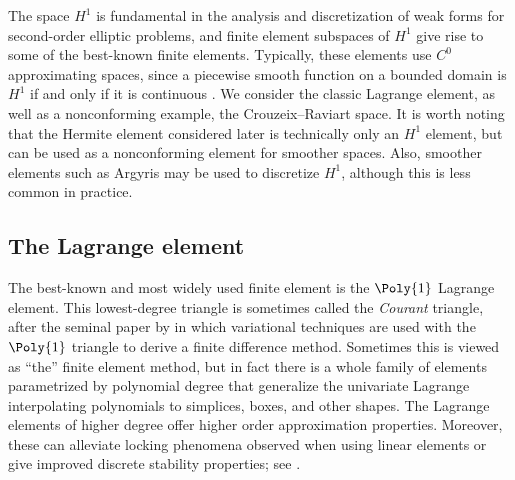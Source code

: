 The space $H^1$ is fundamental in the analysis and discretization of
weak forms for second-order elliptic problems, and finite element
subspaces of $H^1$ give rise to some of the best-known finite
elements. Typically, these elements use $C^0$ approximating spaces,
since a piecewise smooth function on a bounded domain is $H^1$ if and
only if it is continuous \citep[Theorem 5.2]{Braess2007}. We consider
the classic Lagrange element, as well as a nonconforming example, the
Crouzeix--Raviart space. It is worth noting that the Hermite element
considered later is technically only an $H^1$ element, but can be used
as a nonconforming element for smoother spaces.  Also, smoother
elements such as Argyris may be used to discretize $H^1$, although
this is less common in practice.

\subsection{The Lagrange element}

The best-known and most widely used finite element is the $\Poly{1}$
Lagrange element. This lowest-degree triangle is sometimes called the
\emph{Courant} triangle, after the seminal paper by \citet{Courant1943}
in which variational techniques are used with the $\Poly{1}$ triangle
to derive a finite difference method. Sometimes this is viewed as
``the'' finite element method, but in fact there is a whole family of
elements parametrized by polynomial degree that generalize the
univariate Lagrange interpolating polynomials to simplices, boxes, and
other shapes. The Lagrange elements of higher degree offer higher
order approximation properties. Moreover, these can alleviate locking
phenomena observed when using linear elements or give improved
discrete stability properties; see \citet{TaylorHood1973,
  ScottVogelius1985}.

